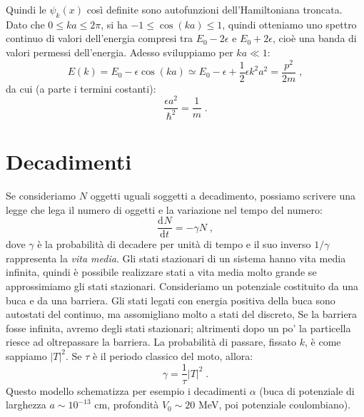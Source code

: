 \documentclass[12pt,a4paper]{report}
\theoremstyle{definition}
\newcommand{\dev}[3][]{\frac{\mathrm{d}^{#1} #2}{\mathrm{d} #3^{#1}}}
\numberwithin{equation}{section}
\begin{document}
Quindi le $\psi_k(x)$ così definite sono autofunzioni dell'Hamiltoniana troncata. Dato che $0\le ka\le 2\pi$, si ha $-1\le \cos(ka)\le 1$, quindi otteniamo uno spettro continuo di valori dell'energia compresi tra $E_0-2\epsilon$ e $E_0+2\epsilon$, cioè una banda di valori permessi dell'energia. Adesso sviluppiamo per $ka\ll 1$:
\begin{equation}
E(k)=E_0-\epsilon\cos(ka)\simeq E_0-\epsilon+\frac{1}{2}\epsilon k^2a^2=\frac{p^2}{2m}\;,
\end{equation}
da cui (a parte i termini costanti):
\begin{equation}
\frac{\epsilon a^2}{\hbar^2}=\frac{1}{m}\;.
\end{equation}
\section{Decadimenti}
Se consideriamo $N$ oggetti uguali soggetti a decadimento, possiamo scrivere una legge che lega il numero di oggetti e la variazione nel tempo del numero:
\begin{equation}
\dev{N}{t}=-\gamma N\;,
\end{equation}
dove $\gamma$ è la probabilità di decadere per unità di tempo e il suo inverso $1/\gamma$ rappresenta la \textit{vita media}. Gli stati stazionari di un sistema hanno vita media infinita, quindi è possibile realizzare stati a vita media molto grande se approssimiamo gli stati stazionari. Consideriamo un potenziale costituito da una buca e da una barriera. Gli stati legati con energia positiva della buca sono autostati del continuo, ma assomigliano molto a stati del discreto, Se la barriera fosse infinita, avremo degli stati stazionari; altrimenti dopo un po' la particella riesce ad oltrepassare la barriera. La probabilità di passare, fissato $k$, è come sappiamo $|T|^2$. Se $\tau$ è il periodo classico del moto, allora:
\begin{equation}
\gamma=\frac{1}{\tau}|T|^2\;.
\end{equation}
Questo modello schematizza per esempio i decadimenti $\alpha$ (buca di potenziale di larghezza $a\sim 10^{-13}$ cm, profondità $V_0\sim 20$ MeV, poi potenziale coulombiano).
\end{document}
